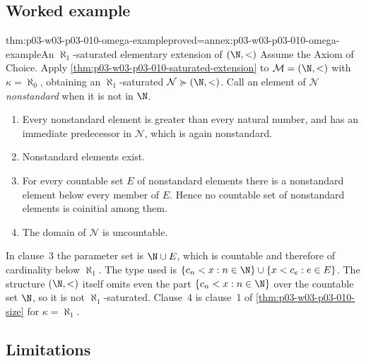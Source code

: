 \subsection{Worked example}
\label{sec:p03-w03-p03-010-example}

\begin{hbtheorem}{thm:p03-w03-p03-010-omega-example}{proved=annex:p03-w03-p03-010-omega-example}{An \(\aleph_1\)-saturated elementary extension of \((\N,<)\)}
Assume the Axiom of Choice.  Apply
\cref{thm:p03-w03-p03-010-saturated-extension} to
\(\mathcal M=(\N,<)\) with \(\kappa=\aleph_0\), obtaining an
\(\aleph_1\)-saturated \(\mathcal N\succcurlyeq(\N,<)\).  Call an element of
\(\mathcal N\) \emph{nonstandard} when it is not in \(\N\).
\begin{enumerate}
  \item Every nonstandard element is greater than every natural number,
        and has an immediate predecessor in \(\mathcal N\), which is again
        nonstandard.
  \item Nonstandard elements exist.
  \item For every countable set \(E\) of nonstandard elements there is a
        nonstandard element below every member of \(E\).  Hence no
        countable set of nonstandard elements is coinitial among them.
  \item The domain of \(\mathcal N\) is uncountable.
\end{enumerate}
\end{hbtheorem}

In clause~3 the parameter set is \(\N\cup E\), which is countable and
therefore of cardinality below \(\aleph_1\).  The type used is
\(\{c_n<x:n\in\N\}\cup\{x<c_e:e\in E\}\).  The structure \((\N,<)\)
itself omits even the part \(\{c_n<x:n\in\N\}\) over the countable set
\(\N\), so it is not \(\aleph_1\)-saturated.  Clause~4 is clause~1 of \cref{thm:p03-w03-p03-010-size} for
\(\kappa=\aleph_1\).

\subsection{Limitations}
\label{sec:p03-w03-p03-010-limits}

